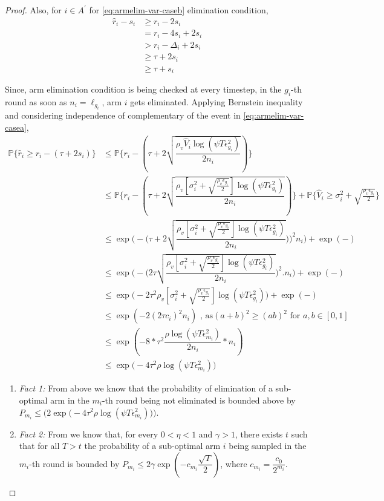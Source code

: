 \begin{proof}
Also, for ${i} \in A^{'}$ for \ref{eq:armelim-var-caseb} elimination condition, 
\begin{align*}
\hat{r}_{i} - s_{i}&\geq r_{i} - 2s_{i} \\
&= r_{i} - 4s_{i} + 2s_{i} \\
&> r_{i} - \Delta_{i} + 2s_{i}\\
&\geq \tau + 2s_{i} \\
&\geq \tau + s_{i}
\end{align*}

Since, arm elimination condition is being checked at every timestep, in the $g_{i}$-th round as soon as $n_{i}=\ell_{g_{i}}$, arm $i$ gets eliminated. Applying Bernstein inequality and considering independence of complementary of the event in \ref{eq:armelim-var-casea},
  \begin{align*}
\mathbb{P}\lbrace\hat{r}_{i}\geq r_{i} - (\tau + 2s_{i})\rbrace &\leq \mathbb{P}\lbrace r_{i}- (\tau + 2\sqrt{\dfrac{\rho_v \hat{V}_{i}\log(\psi T\epsilon_{g_{i}}^{2})}{2n_{i}}}) \rbrace\\
&\leq \mathbb{P}\lbrace r_{i}- (\tau + 2\sqrt{\dfrac{\rho_v [\sigma_{i}^{2}+\sqrt{\frac{\rho_{v}\epsilon_{g_{i}}}{2}}]\log(\psi T\epsilon_{g_{i}}^{2})}{2n_{i}}})\rbrace + \mathbb{P}\lbrace \hat{V}_{i}\geq \sigma_{i}^{2}+\sqrt{\frac{\rho_{v}\epsilon_{g_{i}}}{2}}\rbrace\\
&\leq \exp\bigg(- \big(\tau + 2\sqrt{\dfrac{\rho_v [\sigma_{i}^{2}+\sqrt{\frac{\rho_{v}\epsilon_{g_{i}}}{2}}]\log(\psi T\epsilon_{g_{i}}^{2})}{2n_{i}}})\big)^{2}n_{i}\bigg) + \exp(- )\\
&\leq \exp\bigg(- \big( 2\tau\sqrt{\dfrac{\rho_v [\sigma_{i}^{2}+\sqrt{\frac{\rho_{v}\epsilon_{g_{i}}}{2}}]\log(\psi T\epsilon_{g_{i}}^{2})}{2n_{i}}} \big)^{2}.n_{i}\bigg) + \exp(- )\\
&\leq \exp\bigg(- 2\tau^{2}\rho_v [\sigma_{i}^{2}+\sqrt{\frac{\rho_{v}\epsilon_{g_{i}}}{2}}]\log(\psi T\epsilon_{g_{i}}^{2}) \bigg) + \exp(- )\\
&\leq \exp(-2(2\tau c_{i})^{2}n_{i}) \text{ , as} (a+b)^{2} \geq (ab)^{2} \text{ for } a,b\in[0,1]\\
&\leq \exp(-8 * \tau^{2}\dfrac{\rho\log (\psi T\epsilon_{m_{i}}^{2})}{2 n_{i}} *n_{i})\\
&\leq \exp\big(-4\tau^{2}\rho\log (\psi T\epsilon_{m_{i}}^{2})\big)
  \end{align*}

\begin{enumerate}
\item \emph{Fact 1:} From above we know that the probability of elimination of a sub-optimal arm in the $m_{i}$-th round being not eliminated is bounded above by $P_{m_{i}}\leq\bigg(2\exp\big(-4\tau^{2}\rho\log (\psi T\epsilon_{m_{i}}^{2})\big)\bigg)$.
\item \emph{Fact 2:} From \cite{tolpin2012mcts} we know that, for every $0<\eta <1$ and $\gamma > 1$, there exists $t$ such that for all $T>t$ the probability of a sub-optimal arm $i$ being sampled in the $m_{i}$-th round is bounded by $P_{m_{i}}\leq 2\gamma \exp(-c_{m_{i}}\dfrac{\sqrt{T}}{2})$, where $c_{m_{i}}=\dfrac{c_{0}}{2^{m_{i}}}$.
\end{enumerate}


\end{proof}
